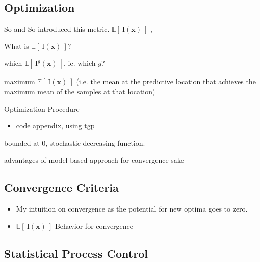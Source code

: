 \documentclass[12pt]{article}
\newcommand{\E}[1]{
        \mathbb{E}\left[#1\right]
}
\def \EIx {
	\mathbb{E}\left[~\text{I}(\bm{x})~\right]
}
\begin{document}
	\subsection{Optimization}
	\begin{itemize}
	\item[\checkmark] {\color{red}So and So} introduced this metric. $\EIx$ \cite{gBook}, \cite{tgp2}
	\item[\checkmark] What is $\EIx$?
	\item[\checkmark] which $\E{~\text{I}^g(\bm{x})~}$, ie. which $g$?\cite{gBook}
	\item[\checkmark] maximum $\EIx$ (i.e. the mean at the predictive location that achieves the maximum mean of the samples at that location)
	\item[\checkmark] Optimization Procedure \cite{tgp2}
		\begin{itemize}
		\item code appendix, using tgp
		\end{itemize}
	\item[\checkmark] bounded at 0, stochastic decreasing function.
	{\color{red}\item[?] advantages of model based approach for convergence sake}
	
	\end{itemize}
	
	\subsection{Convergence Criteria}
	\begin{itemize}
	\item[\checkmark] My intuition on convergence as the potential for new optima goes to zero.
	\item[\checkmark] $\EIx$ Behavior for convergence
	\end{itemize}
	
	\subsection{Statistical Process Control}
\end{document}

